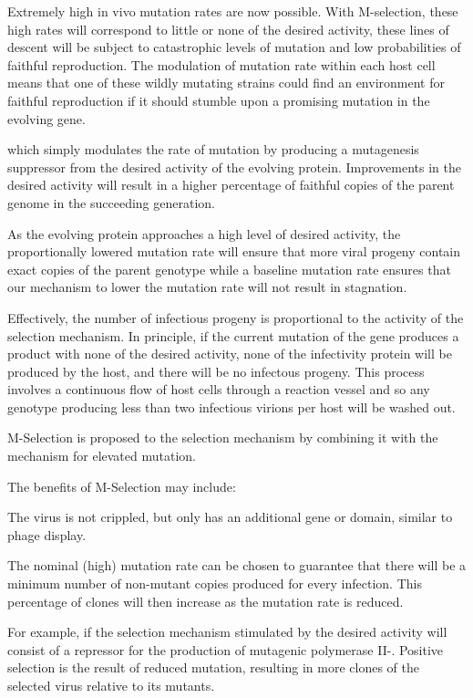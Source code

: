 \documentclass[10pt,letterpaper]{article}
\begin{document}
Extremely high in vivo mutation rates are now possible\cite{mutation}.  With M-selection, these high rates will correspond to little or none of the desired activity, these lines of descent will be subject to catastrophic levels of mutation and low probabilities of faithful reproduction. The modulation of mutation rate within each host cell means that one of these wildly mutating strains could find an environment for faithful reproduction if it should stumble upon a promising mutation in the evolving gene.

which simply modulates the rate of mutation by producing a mutagenesis suppressor from the desired activity of the evolving protein.  Improvements in the desired activity will result in a higher percentage of faithful copies of the parent genome in the succeeding generation.

As the evolving protein approaches a high level of desired activity, the proportionally lowered mutation rate will ensure that more viral progeny contain exact copies of the parent genotype while a baseline mutation rate ensures that our mechanism to lower the mutation rate will not result in stagnation.




Effectively, the number of infectious progeny is proportional to the activity
of the selection mechanism. In principle, if the current mutation of the gene
produces a product with none of the desired activity, none of the infectivity
protein will be produced by the host, and there will be no infectous progeny.
This process involves a continuous flow of host cells through a reaction vessel
and so any genotype producing less than two infectious virions per host will
be washed out.

M-Selection is proposed to the selection mechanism by combining it with
the mechanism for elevated mutation.

The benefits of M-Selection may include:

The virus is not crippled, but only has an additional gene or domain, similar to
phage display.

The nominal (high) mutation rate can be chosen to guarantee that there will be
a minimum number of non-mutant copies produced for every infection.  This percentage of clones will then increase as the mutation rate is reduced.



For example, if the selection mechanism stimulated by the desired activity will consist
of a repressor for the production of mutagenic polymerase II-.
Positive selection is the result of reduced mutation, resulting in more clones of the
selected virus relative to its mutants.
\end{document}
